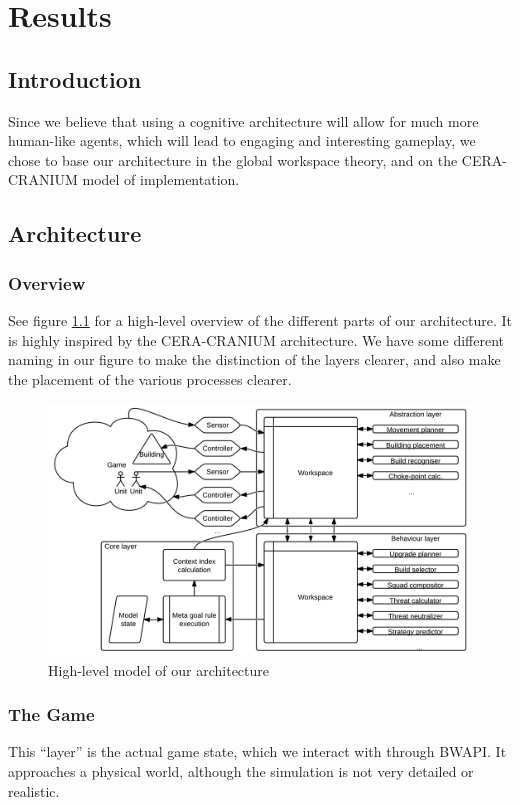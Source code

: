 
\chapter{Results}

\section{Introduction}
Since we believe that using a cognitive architecture will allow for much
more human-like agents, which will lead to engaging and interesting gameplay, we
chose to base our architecture in the global workspace theory, and on the
CERA-CRANIUM model of implementation.

\section{Architecture}
\subsection{Overview}
See figure \ref{fig:our-architecture} for a high-level overview of the
different parts of our architecture. It is highly inspired by the CERA-CRANIUM
architecture. We have some different naming in our figure to make the
distinction of the layers clearer, and also make the placement of the various
processes clearer.

\begin{figure}[h!tb]
\centering
\includegraphics[scale=1.0]{graphics/our-architecture.png}
\caption{High-level model of our architecture}
\label{fig:our-architecture}
\end{figure}

\subsection{The Game}
This ``layer'' is the actual game state, which we interact with through BWAPI.
It approaches a physical world, although the simulation is not very detailed or
realistic.

